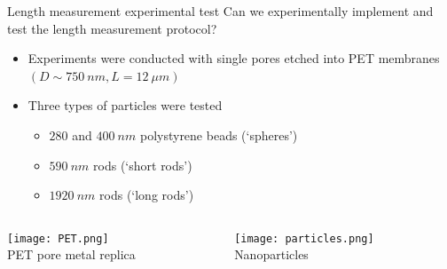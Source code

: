 
\begin{frame}[c]{Length measurement experimental test}
	\textcolor{negativered}{Can we experimentally implement and test the length measurement protocol?} \\
	\begin{itemize}
		\item Experiments were conducted with single pores etched into PET membranes $\left(D\sim\SI{750}{nm}, L=\SI{12}{\mu m}\right)$
		\item Three types of particles were tested
		\begin{itemize}
			\item $280$ and $\SI{400}{nm}$ polystyrene beads  (`spheres')
			\item $\SI{590}{nm}$ rods (`short rods')
			\item $\SI{1920}{nm}$ rods (`long rods')
		\end{itemize}
	\end{itemize}
	
	\begin{columns}[t]
		\begin{column}[T]{2.25in}
			{\centering
				\texttt{[image: PET.png]} \\
				PET pore metal replica \\
				\par
			}
		\end{column}
		
		\begin{column}[T]{2.25in}
			{\centering
				\texttt{[image: particles.png]} \\
				Nanoparticles \\
				\par				
			}
		\end{column}

	\end{columns}



\end{frame}





